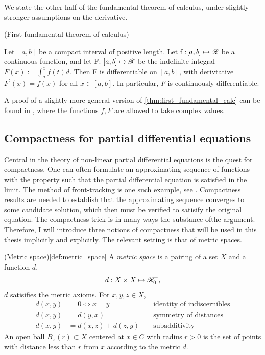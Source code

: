 \begin{definition}
We state the other half of the fundamental theorem of calculus, under slightly stronger assumptions on the derivative. 

\begin{theorem}(First fundamental theorem of calculus) \label{thm:first_fundamental_calc}
	
	Let $[a,b]$ be a compact interval of positive length. Let f :$[a,b] \mapsto \mathscr{R}$ be a continuous function, and let F: $[a,b] \mapsto \mathscr{R}$ be the indefinite integral $F(x):= \int_a^x f(t) d$. Then F is differentiable on $[a,b]$, with derivtative $F^{'}(x) = f(x)$ for all $x \in [a,b]$. In particular, $F$ is continuously differentiable. 
\end{theorem}

A proof of a slightly more general version of \eqref{thm:first_fundamental_calc} can be found in \cite[p.135]{tao2011introduction}, where the functions $f,F$ are allowed to take complex values. 

\subsection{Compactness for partial differential equations}

Central in the theory of non-linear partial differential equations is the quest for compactness. One can often formulate an approximating sequence of functions with the property such that the partial differential equation is satisfied in the limit. The method of front-tracking is one such example, see \cite{holden2015front}. Compactness results are needed to establish that the approximating sequence converges to some candidate solution, which then must be verified to satisify the original equation. The compactness trick is in many ways the substance ofthe argument. Therefore, I will introduce three notions of compactness that will be used in this thesis implicitly and explicitly. The relevant setting is that of metric spaces. 

\begin{definition}(Metric space)\eqref{def:metric_space}
	A \emph{metric space} is a pairing of a set $X$ and a function $d$,  
	\begin{align}
		d : X \times X \mapsto \mathscr{R}^+_0, 
	\end{align}
	$d$ satisifies the metric axioms. For $x,y,z \in X$, 
	\begin{align}
		d(x,y) &= 0 \iff x = y \,\, &&\text{identity of indiscernibles} \label{def:metric_identity}\\
		d(x,y) &= d(y,x) \ \,\, &&\text{symmetry of distances}\label{def:metric_symmetry} \\
		d(x,y) &= d(x,z) + d(z,y)  \,\, &&\text{subadditivity}\label{def:metric_subadditivity}
	\end{align}
	An open ball $B_x(r) \subset X$ centered at $x \in C$ with radius $r > 0$ is
	the set of points with distance less than $r$ from $x$ according to the metric $d$. 
\end{definition}


\end{definition}
